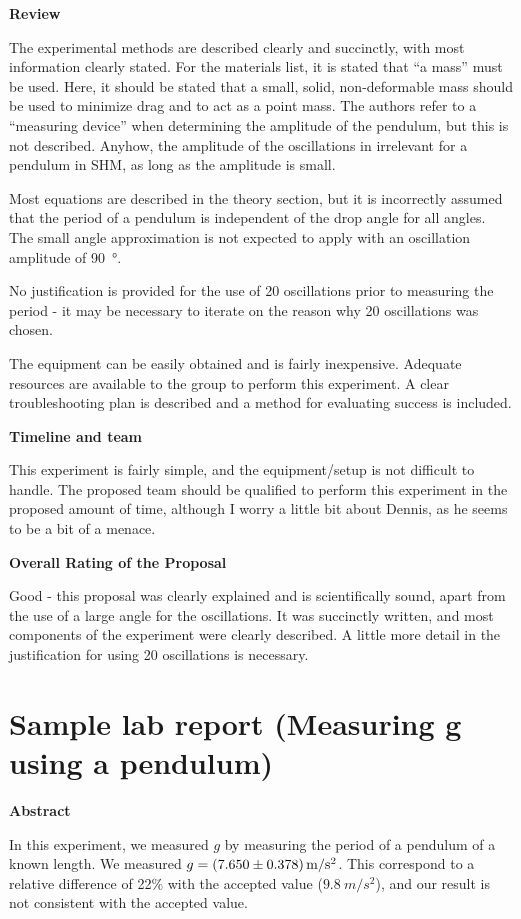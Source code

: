 \textbf{Review}

The experimental methods are described clearly and succinctly, with most information clearly stated. For the materials list, it is stated that ``a mass'' must be used. Here, it should be stated that a small, solid, non-deformable mass should be used to minimize drag and to act as a point mass. The authors refer to a ``measuring device'' when determining the amplitude of the pendulum, but this is not described. Anyhow, the amplitude of the oscillations in irrelevant for a pendulum in SHM, as long as the amplitude is small.

Most equations are described in the theory section, but it is incorrectly assumed that the period of a pendulum is independent of the drop angle for all angles. The small angle approximation is not expected to apply with an oscillation amplitude of \SI{90}{\degree}.

No justification is provided for the use of 20 oscillations prior to measuring the period - it may be necessary to iterate on the reason why 20 oscillations was chosen. 

The equipment can be easily obtained and is fairly inexpensive. Adequate resources are available to the group to perform this experiment. A clear troubleshooting plan is described and a method for evaluating success is included. 

\textbf{Timeline and team}

This experiment is fairly simple, and the equipment/setup is not difficult to handle. The proposed team should be qualified to perform this experiment in the proposed amount of time, although I worry a little bit about Dennis, as he seems to be a bit of a menace.

\textbf{Overall Rating of the Proposal}

Good - this proposal was clearly explained and is scientifically sound, apart from the use of a large angle for the oscillations. It was succinctly written, and most components of the experiment were clearly described. A little more detail in the justification for using 20 oscillations is necessary. 


\newpage
\section{Sample lab report (Measuring g using a pendulum)}
 \vspace{0.25cm}
\textbf{Abstract}

In this experiment, we measured $g$ by measuring the period of a pendulum of a known length. We measured $g = \SI{7.65\pm 0.378}{m/s^2}$. This correspond to a relative difference of 22\% with the accepted value ($\SI{9.8}{m/s^2}$), and our result is not consistent with the accepted value.


